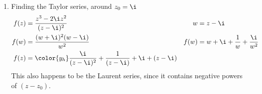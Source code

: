 \begin{enumerate}
    \item Finding the Taylor series, around $ z_0 = \i $
          \begin{align}
              f(z) & = \frac{z^3 - 2\i z^2}{(z - \i)^2}                   &
              w    & = z - \i                                               \\
              f(w) & = \frac{(w + \i)^2 (w - \i)}{w^2}                    &
              f(w) & = w + \i + \frac{1}{w} + \frac{\i}{w^2}                \\
              f(z) & = \color{y_h} \frac{\i}{(z-\i)^2} + \frac{1}{(z-\i)}
              + \i + (z-\i)
          \end{align}
          This also happens to be the Laurent series, since it contains negative
          powers of $ (z - z_0) $.
\end{enumerate}